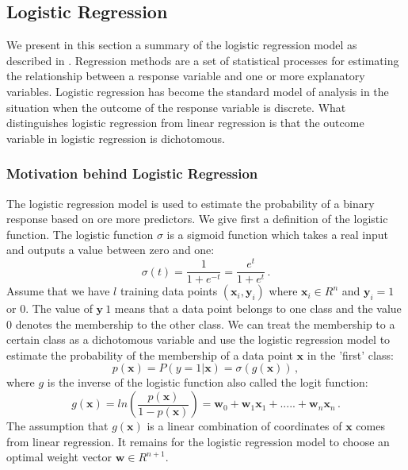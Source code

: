 \documentclass[a4paper,11pt,oneside]{article}
\begin{document}
\subsection{Logistic Regression}\label{logistic}
We present in this section a summary of the logistic regression model as described in \cite{hosmer2013applied}.
Regression methods are a set of statistical processes for estimating the relationship between a response variable
and one or more explanatory variables. Logistic regression has become the standard model of analysis in the situation when the outcome of the response variable
is discrete. What distinguishes logistic regression from linear regression is that the outcome variable in logistic regression 
is dichotomous. 
\subsubsection*{Motivation behind Logistic Regression}
The logistic regression model is used to estimate the probability of a binary response based on ore more predictors.
We give first a definition of the logistic function. The logistic function $\sigma$ is a sigmoid function which takes a real input
and outputs a value between zero and one:
\begin{equation}
  \sigma(t) = \frac{1}{1+e^{-t}} = \frac{e^t}{1+e^t}\,. 
\end{equation}
Assume that we have $l$ training data points $(\mathbf{x}_i,\mathbf{y}_i)$ where
$\mathbf{x}_i \in R^n$ and $\mathbf{y}_i=1$ or $0$. The value of $\mathbf{y}\ 1$  means that a data point belongs to one 
class and the value $0$ denotes the membership to the other class. We can treat the membership to a certain class
as a dichotomous variable and use the logistic regression model to estimate the probability of the membership of a
data point $\mathbf{x}$ in the 'first' class:
\begin{equation}
  p(\mathbf{x}) = P(y=1|\mathbf{x}) = \sigma(g(\mathbf{x}))\,,
\end{equation}
where $g$ is the inverse of the logistic function also called the logit function:
\begin{equation}
  g(\mathbf{x}) = ln(\frac{p(\mathbf{x})}{1-p(\mathbf{x})}) = \mathbf{w}_0+\mathbf{w}_1\mathbf{x}_1+.....+\mathbf{w}_n\mathbf{x}_n\,.
\end{equation}
The assumption that $g(\mathbf{x})$ is a linear combination of coordinates of $\mathbf{x}$ comes from linear regression.
It remains for the logistic regression model to choose an optimal weight vector $\mathbf{w}\in R^{n+1}$. 
\end{document}
